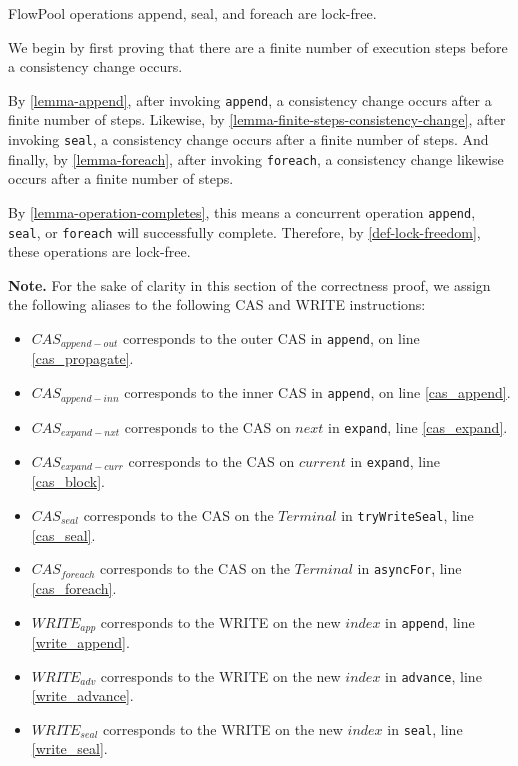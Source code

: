 \documentclass[runningheads,a4paper]{llncs}
\begin{document}
\begin{theorem}\label{theorem-lock-freedom}
FlowPool operations append, seal, and foreach are lock-free.

We begin by first proving that there are a finite number of execution steps
before a consistency change occurs.

By \ref{lemma-append}, after invoking \verb=append=, a consistency
change occurs after a finite number of steps. Likewise, by 
\ref{lemma-finite-steps-consistency-change}, after invoking \verb=seal=, a consistency
change occurs after a finite number of steps. And finally, by
\ref{lemma-foreach},
after invoking \verb=foreach=, a consistency change likewise
occurs after a finite number of steps.

By \ref{lemma-operation-completes}, this means a concurrent operation
\verb=append=, \verb=seal=, or \verb=foreach= will successfully complete.
Therefore, by \ref{def-lock-freedom},  these operations are lock-free.

\end{theorem}


\noindent \textbf{Note.} For the sake of clarity in this section of the
correctness proof, we assign the following aliases to the following CAS and
WRITE instructions:

\begin{itemize}
\setlength{\itemindent}{-1em}
\item $CAS_{append-out}$ corresponds to the outer CAS in \verb=append=, on line \ref{cas_propagate}.
\item $CAS_{append-inn}$ corresponds to the inner CAS in \verb=append=, on line \ref{cas_append}.
\item $CAS_{expand-nxt}$ corresponds to the CAS on $next$ in \verb=expand=, line \ref{cas_expand}.
\item $CAS_{expand-curr}$ corresponds to the CAS on $current$ in \verb=expand=, line \ref{cas_block}.
\item $CAS_{seal}$ corresponds to the CAS on the $Terminal$ in \verb=tryWriteSeal=, line \ref{cas_seal}.
\item $CAS_{foreach}$ corresponds to the CAS on the $Terminal$ in \verb=asyncFor=, line \ref{cas_foreach}.
\item $WRITE_{app}$ corresponds to the WRITE on the new $index$ in \verb=append=, line \ref{write_append}.
\item $WRITE_{adv}$ corresponds to the WRITE on the new $index$ in \verb=advance=, line \ref{write_advance}.
\item $WRITE_{seal}$ corresponds to the WRITE on the new $index$ in \verb=seal=, line \ref{write_seal}.
\end{itemize}
\end{document}
